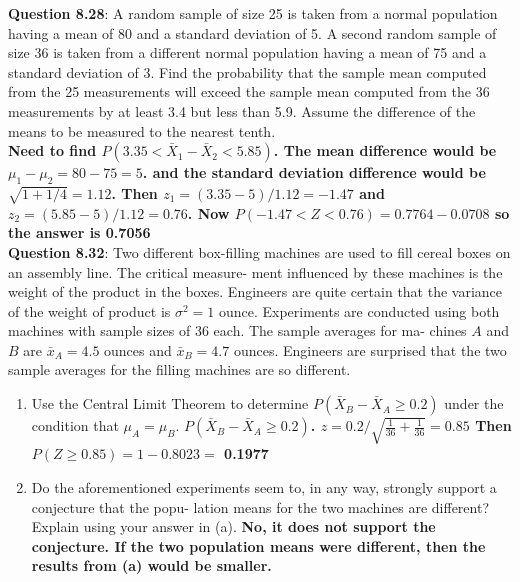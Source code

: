 \documentclass{article}
\begin{document}
    \textbf{Question 8.28}: A random sample of size 25 is taken from a 
    normal population having a mean of 80 and a standard
    deviation of 5. A second random sample of size 36
    is taken from a different normal population having a
    mean of 75 and a standard deviation of 3. Find the
    probability that the sample mean computed from the
    25 measurements will exceed the sample mean computed 
    from the 36 measurements by at least 3.4 but
    less than 5.9. Assume the difference of the means to
    be measured to the nearest tenth.\\\newline
    \textbf{Need to find $P(3.35 < \bar{X}_1 - \bar{X}_2 < 5.85)$. The mean 
    difference would be $\mu_1 - \mu_2 = 80 - 75 = 5$. and the standard 
    deviation difference would be $\sqrt{1 + 1/4} = 1.12$. Then $z_1=(3.35-5)/1.12=-1.47$
    and $z_2=(5.85-5)/1.12 = 0.76$. Now $P(-1.47< Z < 0.76) = 0.7764-0.0708$ so the
    answer is 0.7056}\\\newline
    \textbf{Question 8.32}: Two different box-filling machines are used to fill
    cereal boxes on an assembly line. The critical measure-
    ment influenced by these machines is the weight of the
    product in the boxes. Engineers are quite certain that
    the variance of the weight of product is $\sigma^2 = 1$ ounce.
    Experiments are conducted using both machines with
    sample sizes of 36 each. The sample averages for ma-
    chines $A$ and $B$ are $\bar{x}_A = 4.5$ ounces and $\bar{x}_B = 4.7$
    ounces. Engineers are surprised that the two sample
    averages for the filling machines are so different.
        \begin{enumerate}[label = (\alph*) ]
            \item Use the Central Limit Theorem to determine $P(\bar{X}_B - \bar{X}_A \geq 0.2)$
            under the condition that $\mu_A = \mu_B$.\newline
                \textbf{$P(\bar{X}_B-\bar{X}_A \geq 0.2)$. $z=0.2/\sqrt{\frac{1}{36}+\frac{1}{36}} = 0.85$
                Then $P(Z \geq 0.85) = 1-0.8023 =$ 0.1977}
            \item Do the aforementioned experiments seem to, in any
            way, strongly support a conjecture that the popu-
            lation means for the two machines are different?
            Explain using your answer in (a).\newline
                \textbf{No, it does not support the conjecture. 
                If the two population means were different, then
                the results from (a) would be smaller.}
        \end{enumerate}
\end{document}
